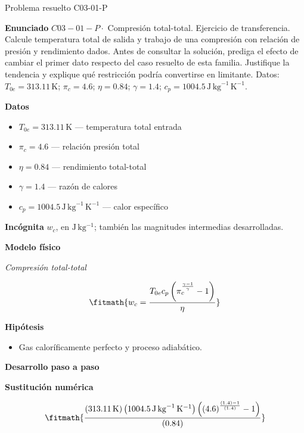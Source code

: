 \documentclass[10pt,openany]{book}
\begin{document}
\begin{studiumworked}{Problema resuelto C03-01-P}


\noindent\textbf{Enunciado}
\(C03-01-P \cdot\) Compresión total-total. Ejercicio de transferencia. Calcule temperatura total de salida y trabajo de una compresión con relación de presión y rendimiento dados. Antes de consultar la solución, prediga el efecto de cambiar el primer dato respecto del caso resuelto de esta familia. Justifique la tendencia y explique qué restricción podría convertirse en limitante. Datos: \(T_{0e}=313.11\, \mathrm{K}\); \(\pi_c=4.6\); \(\eta=0.84\); \(\gamma=1.4\); \(c_p=1004.5\, \mathrm{J}\,\mathrm{kg}^{-1}\,\mathrm{K}^{-1}\).

\noindent\textbf{Datos}
\begin{itemize}
\item $T_{0e} = 313.11\,\mathrm{K}$ — temperatura total entrada
\item $\pi_c = 4.6$ — relación presión total
\item $\eta = 0.84$ — rendimiento total-total
\item $\gamma = 1.4$ — razón de calores
\item $c_p = 1004.5\,\mathrm{J}\,\mathrm{kg}^{-1}\,\mathrm{K}^{-1}$ — calor específico
\end{itemize}

\noindent\textbf{Incógnita}
$w_c$, en $\mathrm{J\,kg^{-1}}$; también las magnitudes intermedias desarrolladas.

\noindent\textbf{Modelo físico}

\noindent\textit{Compresión total-total}

\[
\fitmath{w_c=\frac{T_{0e} c_p \left(\pi_c^{\frac{\gamma - 1}{\gamma}} - 1\right)}{\eta}}
\]

\noindent\textbf{Hipótesis}
\begin{itemize}
\item Gas caloríficamente perfecto y proceso adiabático.
\end{itemize}

\noindent\textbf{Desarrollo paso a paso}



\noindent\textbf{Sustitución numérica}

\[
\fitmath{\frac{\left(313.11\,\mathrm{K}\right) \left(1004.5\,\mathrm{J}\,\mathrm{kg}^{-1}\,\mathrm{K}^{-1}\right) \left(\left(4.6\right)^{\frac{\left(1.4\right) - 1}{\left(1.4\right)}} - 1\right)}{\left(0.84\right)}}
\]


\end{studiumworked}
\end{document}
